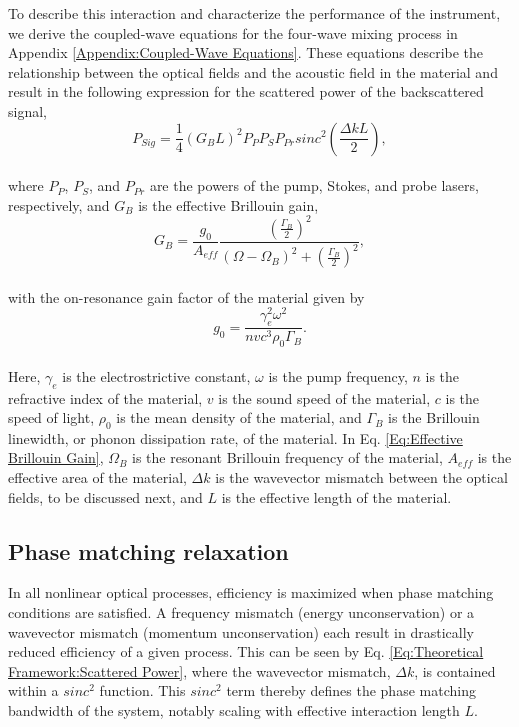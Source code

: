 \documentclass[%
  reprint,
  superscriptaddress,
  amsmath,amssymb,
  aps,
  prapplied,
]{revtex4-2}
\begin{document}
To describe this interaction and characterize the performance of the instrument, we derive the coupled-wave equations for the four-wave mixing process in Appendix \ref{Appendix:Coupled-Wave Equations}. These equations describe the relationship between the optical fields and the acoustic field in the material and result in the following expression for the scattered power of the backscattered signal,
\\
\begin{equation}
  P_{Sig} = \frac{1}{4}(G_{B}L)^{2}P_{P}P_{S}P_{Pr}sinc^{2}\left(\frac{\Delta kL}{2}\right),
  \label{Eq:Theoretical Framework:Scattered Power} %
\end{equation}
\\
where $P_{P}$, $P_{S}$, and $P_{Pr}$ are the powers of the pump, Stokes, and probe lasers, respectively, and $G_{B}$ is the effective Brillouin gain,
\\
\begin{equation}
  G_{B} = \frac{g_{0}}{A_{eff}}\frac{\left(\frac{\Gamma_{B}}{2}\right)^{2}}{(\Omega - \Omega_{B})^{2} + \left(\frac{\Gamma_{B}}{2}\right)^{2}},
  \label{Eq:Effective Brillouin Gain}
\end{equation}
\\
with the on-resonance gain factor of the material given by
\\
\begin{equation}
  g_{0} = \frac{\gamma_{e}^{2}\omega^{2}}{nvc^{3}\rho_{0}\Gamma_{B}}.
\end{equation}
\\
Here, $\gamma_{e}$ is the electrostrictive constant, $\omega$ is the pump frequency, $n$ is the refractive index of the material, $v$ is the sound speed of the material, $c$ is the speed of light, $\rho_{0}$ is the mean density of the material, and $\Gamma_{B}$ is the Brillouin linewidth, or phonon dissipation rate, of the material. In Eq. \ref{Eq:Effective Brillouin Gain}, $\Omega_{B}$ is the resonant Brillouin frequency of the material, $A_{eff}$ is the effective area of the material, $\Delta k$ is the wavevector mismatch between the optical fields, to be discussed next, and $L$ is the effective length of the material.


\subsection*{Phase matching relaxation}
\label{Theoretical Framework: Phase matching relaxation}
In all nonlinear optical processes, efficiency is maximized when phase matching conditions are satisfied. A frequency mismatch (energy unconservation) or a wavevector mismatch (momentum unconservation) each result in drastically reduced efficiency of a given process.\cite{maker1962effects} This can be seen by Eq. \ref{Eq:Theoretical Framework:Scattered Power}, where the wavevector mismatch, $\Delta k$, is contained within a $sinc^{2}$ function. This $sinc^{2}$ term thereby defines the phase matching bandwidth of the system, notably scaling with effective interaction length $L$.
\end{document}
